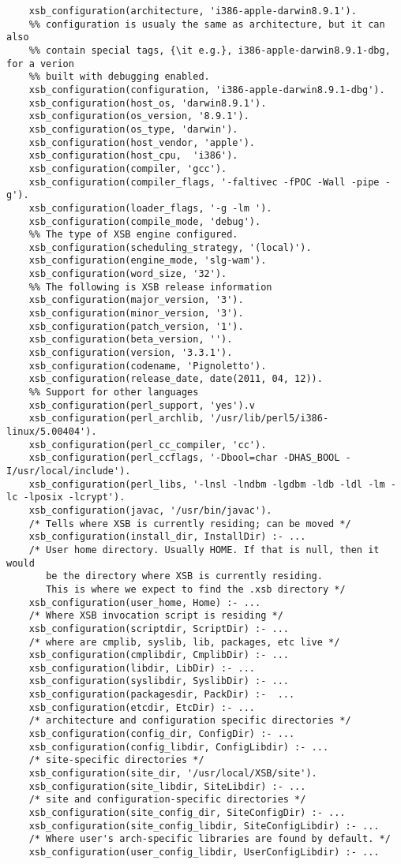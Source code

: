 \begin{description}
{\small
\begin{verbatim}
    xsb_configuration(architecture, 'i386-apple-darwin8.9.1').
    %% configuration is usualy the same as architecture, but it can also
    %% contain special tags, {\it e.g.}, i386-apple-darwin8.9.1-dbg, for a verion
    %% built with debugging enabled.
    xsb_configuration(configuration, 'i386-apple-darwin8.9.1-dbg').
    xsb_configuration(host_os, 'darwin8.9.1').
    xsb_configuration(os_version, '8.9.1').
    xsb_configuration(os_type, 'darwin').
    xsb_configuration(host_vendor, 'apple').
    xsb_configuration(host_cpu,  'i386').
    xsb_configuration(compiler, 'gcc').
    xsb_configuration(compiler_flags, '-faltivec -fPOC -Wall -pipe -g').
    xsb_configuration(loader_flags, '-g -lm ').
    xsb_configuration(compile_mode, 'debug').
    %% The type of XSB engine configured.
    xsb_configuration(scheduling_strategy, '(local)').
    xsb_configuration(engine_mode, 'slg-wam').
    xsb_configuration(word_size, '32').
    %% The following is XSB release information
    xsb_configuration(major_version, '3').
    xsb_configuration(minor_version, '3').
    xsb_configuration(patch_version, '1').
    xsb_configuration(beta_version, '').
    xsb_configuration(version, '3.3.1').
    xsb_configuration(codename, 'Pignoletto').
    xsb_configuration(release_date, date(2011, 04, 12)).
    %% Support for other languages
    xsb_configuration(perl_support, 'yes').v
    xsb_configuration(perl_archlib, '/usr/lib/perl5/i386-linux/5.00404').
    xsb_configuration(perl_cc_compiler, 'cc').
    xsb_configuration(perl_ccflags, '-Dbool=char -DHAS_BOOL -I/usr/local/include').
    xsb_configuration(perl_libs, '-lnsl -lndbm -lgdbm -ldb -ldl -lm -lc -lposix -lcrypt').
    xsb_configuration(javac, '/usr/bin/javac').
    /* Tells where XSB is currently residing; can be moved */
    xsb_configuration(install_dir, InstallDir) :- ...
    /* User home directory. Usually HOME. If that is null, then it would
       be the directory where XSB is currently residing.
       This is where we expect to find the .xsb directory */
    xsb_configuration(user_home, Home) :- ...
    /* Where XSB invocation script is residing */
    xsb_configuration(scriptdir, ScriptDir) :- ...
    /* where are cmplib, syslib, lib, packages, etc live */
    xsb_configuration(cmplibdir, CmplibDir) :- ...
    xsb_configuration(libdir, LibDir) :- ...
    xsb_configuration(syslibdir, SyslibDir) :- ...
    xsb_configuration(packagesdir, PackDir) :-  ...
    xsb_configuration(etcdir, EtcDir) :- ...
    /* architecture and configuration specific directories */
    xsb_configuration(config_dir, ConfigDir) :- ...
    xsb_configuration(config_libdir, ConfigLibdir) :- ...
    /* site-specific directories */
    xsb_configuration(site_dir, '/usr/local/XSB/site').
    xsb_configuration(site_libdir, SiteLibdir) :- ...
    /* site and configuration-specific directories */
    xsb_configuration(site_config_dir, SiteConfigDir) :- ...
    xsb_configuration(site_config_libdir, SiteConfigLibdir) :- ...
    /* Where user's arch-specific libraries are found by default. */
    xsb_configuration(user_config_libdir, UserConfigLibdir) :- ...
\end{verbatim}
}


\end{description}
